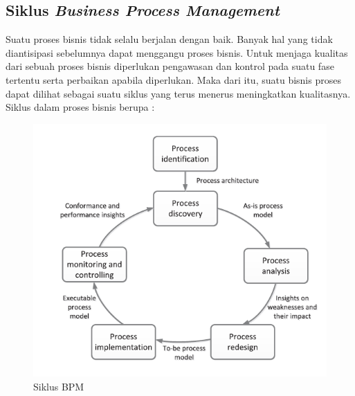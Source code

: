 \subsection{Siklus \textit{Business Process Management}}
\label{sec:siklusBPM}
Suatu proses bisnis tidak selalu berjalan dengan baik. Banyak hal yang tidak diantisipasi sebelumnya dapat menggangu proses bisnis. Untuk menjaga kualitas dari sebuah proses bisnis diperlukan pengawasan dan kontrol pada suatu fase tertentu serta perbaikan apabila diperlukan. Maka dari itu, suatu bisnis proses dapat dilihat sebagai suatu siklus yang terus menerus meningkatkan kualitasnya. Siklus dalam proses bisnis berupa :
\begin{figure}[H]
	\centering
	\includegraphics[scale=0.5]{Gambar/Bab-2/2-bpm-lifeCycle}
	\caption{Siklus BPM} 
	\label{siklusbpm}
\end{figure}

